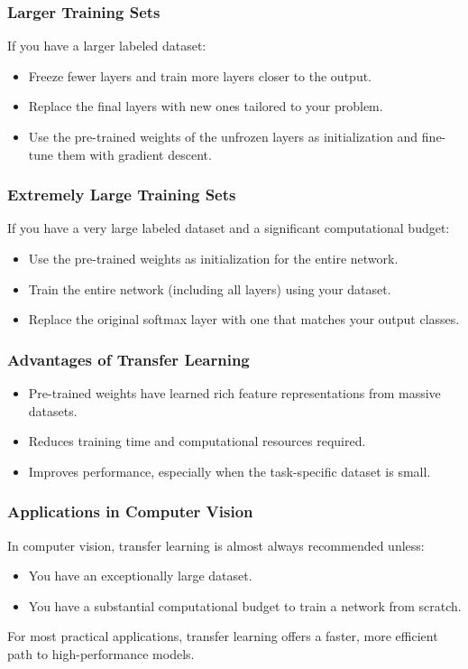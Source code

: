 \documentclass[letterpaper,12pt,notitlepage,twoside]{report}
\begin{document}
\subsubsection*{Larger Training Sets}
If you have a larger labeled dataset:
\begin{itemize}[nosep]
    \item Freeze fewer layers and train more layers closer to the output. 
    \item Replace the final layers with new ones tailored to your problem.
    \item Use the pre-trained weights of the unfrozen layers as initialization and fine-tune them with gradient descent.
\end{itemize}

\subsubsection*{Extremely Large Training Sets}
If you have a very large labeled dataset and a significant computational budget:
\begin{itemize}[nosep]
    \item Use the pre-trained weights as initialization for the entire network.
    \item Train the entire network (including all layers) using your dataset.
    \item Replace the original softmax layer with one that matches your output classes.
\end{itemize}

\subsubsection*{Advantages of Transfer Learning}
\begin{itemize}[nosep]
    \item Pre-trained weights have learned rich feature representations from massive datasets.
    \item Reduces training time and computational resources required.
    \item Improves performance, especially when the task-specific dataset is small.
\end{itemize}

\subsubsection*{Applications in Computer Vision}
In computer vision, transfer learning is almost always recommended unless:
\begin{itemize}[nosep]
    \item You have an exceptionally large dataset.
    \item You have a substantial computational budget to train a network from scratch.
\end{itemize}
For most practical applications, transfer learning offers a faster, more efficient path to high-performance models.
\end{document}
